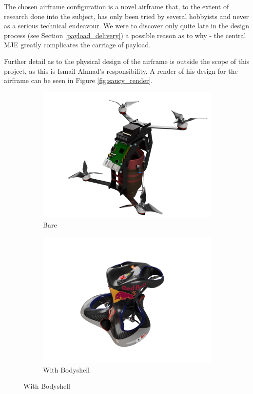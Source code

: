 \documentclass[11pt]{article}
\begin{document}
The chosen airframe configuration is a novel airframe that, to the extent of research done into the subject, has only been tried by several hobbyists and never as a serious technical endeavour. We were to discover only quite late in the design process (see Section \ref{payload_delivery}) a possible reason as to why - the central MJE greatly complicates the carriage of payload.

Further detail as to the physical design of the airframe is outside the scope of this project, as this is Ismail Ahmad's responsibility\cite{Ismail_paper}. A render of his design for the airframe can be seen in Figure \ref{fig:saucy_render}\cite{Ismail_paper}.

\begin{figure}[h]
    \begin{subfigure}{0.48\textwidth}
        \includegraphics[width=\linewidth]{saucy_render_bare}
        \caption{Bare}
        \label{fig:saucy_render_bare}
    \end{subfigure}\hspace*{\fill}
    \begin{subfigure}{0.48\textwidth}
        \includegraphics[width=\linewidth]{saucy_render_w_bodyshell}
        \caption{With Bodyshell}
        \label{fig:saucy_render_w_bodyshell}
    \end{subfigure}


\end{figure}
\end{document}
